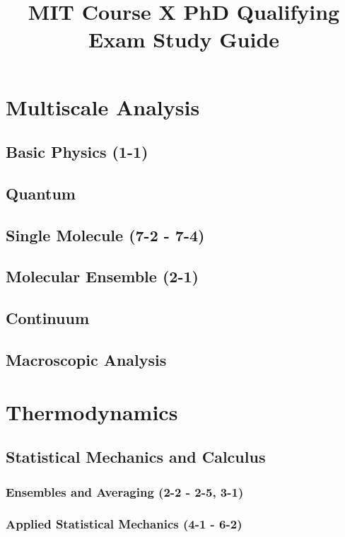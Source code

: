 \documentclass{report}
\title{MIT Course X PhD Qualifying Exam Study Guide}
\newcommand{\sepspace}{\vspace*{1em}}			%
\begin{document}
\maketitle

\newpage

\tableofcontents

\newpage
 
\chapter{Multiscale Analysis}
\section{Basic Physics (1-1)}

\section{Quantum}
\section{Single Molecule (7-2 - 7-4)}



\section{Molecular Ensemble (2-1)}

\section{Continuum}
\section{Macroscopic Analysis}
\chapter{Thermodynamics}
\section{Statistical Mechanics and Calculus}
\subsection{Ensembles and Averaging (2-2 - 2-5, 3-1)}




\subsection{Applied Statistical Mechanics (4-1 - 6-2)}


\end{document}
